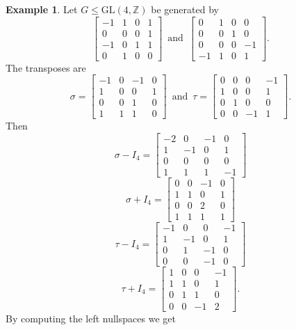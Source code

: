\documentclass{article}
\theoremstyle{plain}
\theoremstyle{definition}
\newtheorem{example}[theorem]{Example}
\newcommand{\Z}{\ensuremath{\mathbb{Z}}}
\newcommand{\tand}{\ensuremath{\,\,\, \text{and} \,\,\,}}
\begin{document}
\begin{example}
Let $G\leq \mathrm{GL}(4,\Z)$ be generated by
$$
\left[ \begin {array}{cccc} -1&1&0&1\\ 0&0&0&1
\\ -1&0&1&1\\ 0&1&0&0\end {array}
 \right] 
\tand
\left[ \begin {array}{cccc} 0&1&0&0\\ 0&0&1&0
\\ 0&0&0&-1\\ -1&1&0&1\end {array}
 \right].
$$ 
The transposes are
$$
\sigma = \left[ \begin {array}{cccc} -1&0&-1&0\\ 1&0&0&1
\\ 0&0&1&0\\ 1&1&1&0\end {array}
 \right] 
\tand 
\tau =  \left[ \begin {array}{cccc} 0&0&0&-1\\ 1&0&0&1
\\ 0&1&0&0\\ 0&0&-1&1\end {array}
 \right].
$$ 
Then 
$$\sigma - I_4 = \left[ \begin {array}{cccc} -2&0&-1&0\\ 1&-1&0&1
\\ 0&0&0&0\\ 1&1&1&-1\end {array}
 \right] $$
 $$\sigma + I_4 = \left[ \begin {array}{cccc} 0&0&-1&0\\ 1&1&0&1
\\ 0&0&2&0\\ 1&1&1&1\end {array}
 \right] $$
 $$\tau - I_4 = \left[ \begin {array}{cccc} -1&0&0&-1\\ 1&-1&0&1
\\ 0&1&-1&0\\ 0&0&-1&0\end {array}
 \right] $$
 $$\tau + I_4 = \left[ \begin {array}{cccc} 1&0&0&-1\\ 1&1&0&1
\\ 0&1&1&0\\ 0&0&-1&2\end {array}
 \right]. $$
By computing the left nullspaces we get 

\end{example}
\end{document}

